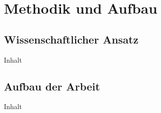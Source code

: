 \section{Methodik und Aufbau}
\label{sec:01-05_methodology-and-structure}

\subsection{Wissenschaftlicher Ansatz}
\label{subsec:01-05-01_scientific-approach}

Inhalt

\subsection{Aufbau der Arbeit}
\label{subsec:01-05-02_structure-of-the-thesis}

Inhalt
